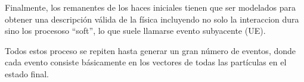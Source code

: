 Finalmente, los remanentes de los haces iniciales tienen que ser modelados
para obtener una descripción válida de la física incluyendo no solo la
interaccion dura sino los procesoso ``soft'', lo que suele llamarse evento
subyacente (UE).

Todos estos proceso se repiten hasta generar un gran número de eventos, donde cada
evento consiste básicamente en los vectores de todas las partículas en el estado
final.













